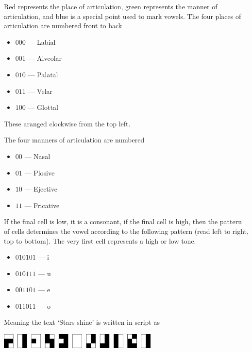 Red represents the place of articulation, green represents the manner of articulation, and blue is a special point used to mark vowels. The four places of articulation are numbered front to back

\begin{itemize}[label={}]
    \item $000$ --- Labial
    \item $001$ --- Alveolar
    \item $010$ --- Palatal
    \item $011$ --- Velar
    \item $100$ --- Glottal
\end{itemize}

These aranged clockwise from the top left.

The four manners of articulation are numbered

\begin{itemize}[label={}]
    \item $00$ --- Nasal
    \item $01$ --- Plosive
    \item $10$ --- Ejective
    \item $11$ --- Fricative
\end{itemize}

If the final cell is low, it is a consonant, if the final cell is high, then the pattern of cells determines the vowel according to the following pattern (read left to right, top to bottom). The very first cell represents a high or low tone.

\begin{itemize}[label={}]
    \item $010101$ --- i
    \item $010111$ --- u
    \item $001101$ --- e
    \item $011011$ --- o
\end{itemize}

Meaning the text `Stars shine' is written in script as

\includegraphics[width=0.6\textwidth]{images/sunshine}